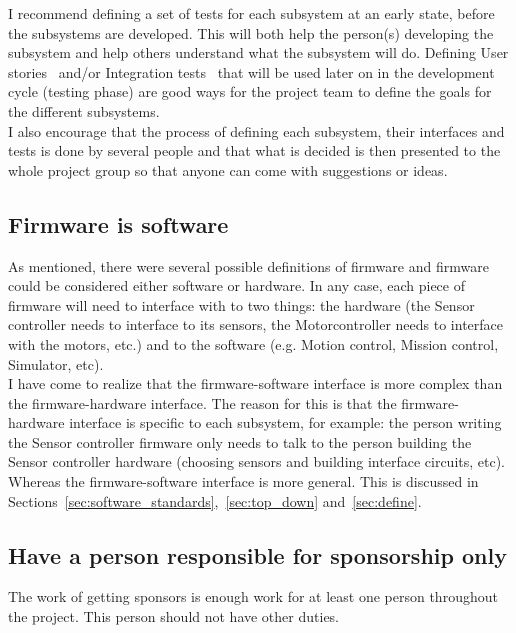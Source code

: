 I recommend defining a set of tests for each subsystem at an early state, before the subsystems are developed.
This will both help the person(s) developing the subsystem and help others understand what the subsystem will do. 
Defining User stories~\cite{web:wiki_user_story} and/or Integration tests~\cite{web:wiki_integration_testing} that will be used later on in the development cycle (testing phase) are good ways for the project team to define the goals for the different subsystems. \\
I also encourage that the process of defining each subsystem, their interfaces and tests is done by several people and that what is decided is then presented to the whole project group so that anyone can come with suggestions or ideas.


\subsection{Firmware is software}\label{sec:firmware}
As mentioned, there were several possible definitions of firmware and firmware could be considered either software or hardware. In any case, each piece of firmware will need to interface with to two things: the hardware (the Sensor controller needs to interface to its sensors, the Motorcontroller needs to interface with the motors, etc.) and to the software (e.g. Motion control, Mission control, Simulator, etc). \\
I have come to realize that the firmware-software interface is more complex than the firmware-hardware interface. The reason for this is that the firmware-hardware interface is specific to each subsystem, for example: the person writing the Sensor controller firmware only needs to talk to the person building the Sensor controller hardware (choosing sensors and building interface circuits, etc). Whereas the firmware-software interface is more general. This is discussed in Sections~\ref{sec:software_standards},~\ref{sec:top_down} and~\ref{sec:define}.


\subsection{Have a person responsible for sponsorship only}
The work of getting sponsors is enough work for at least one person throughout the project. This person should not have other duties.

